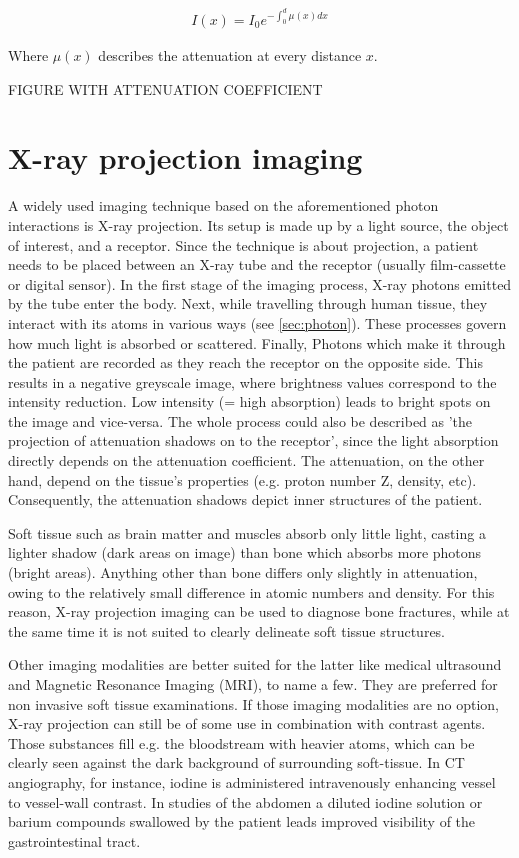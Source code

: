\begin{align}
\label{eq:mu_int}
I(x) = I_0 e^{- \int_{0}^{d} \mu(x)dx}
\end{align}

Where $\mu(x)$ describes the attenuation at every distance $x$.

FIGURE WITH ATTENUATION COEFFICIENT



\section{X-ray projection imaging}
A widely used imaging technique based on the aforementioned photon interactions is X-ray projection.
Its setup is made up by a light source, the object of interest, and a receptor.
Since the technique is about projection, a patient needs to be placed between an X-ray tube and the receptor (usually film-cassette or digital sensor).
In the first stage of the imaging process, X-ray photons emitted by the tube enter the body.
Next, while travelling through human tissue, they interact with its atoms in various ways (see \ref{sec:photon}).
These processes govern how much light is absorbed or scattered.
Finally, Photons which make it through the patient are recorded as they reach the receptor on the opposite side.
This results in a negative greyscale image, where brightness values correspond to the intensity reduction.
Low intensity (= high absorption) leads to bright spots on the image and vice-versa.
The whole process could also be described as 'the projection of attenuation shadows on to the receptor', since the light absorption directly depends on the attenuation coefficient. The attenuation, on the other hand, depend on the tissue's properties (e.g. proton number Z, density, etc).
Consequently, the attenuation shadows depict inner structures of the patient.

Soft tissue such as brain matter and muscles absorb only little light, casting a lighter shadow (dark areas on image) than bone which absorbs more photons (bright areas).
Anything other than bone differs only slightly in attenuation, owing to the relatively small difference in atomic numbers and density.
For this reason, X-ray projection imaging can be used to diagnose bone fractures, while at the same time it is not suited to clearly delineate soft tissue structures.
 
Other imaging modalities are better suited for the latter like medical ultrasound and Magnetic Resonance Imaging (MRI), to name a few. They are preferred for non invasive soft tissue examinations.
If those imaging modalities are no option, X-ray projection can still be of some use in combination with contrast agents.
Those substances fill e.g. the bloodstream with heavier atoms, which can be clearly seen against the dark background of surrounding soft-tissue.
In CT angiography, for instance, iodine is administered intravenously enhancing vessel to vessel-wall contrast.
In studies of the abdomen a diluted iodine solution or barium compounds swallowed by the patient leads improved visibility of the gastrointestinal tract.

